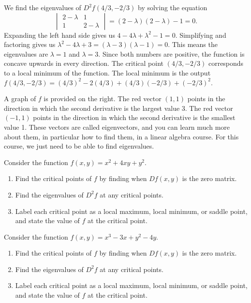 \begin{example}
{}
We find the eigenvalues of $D^2 f(4/3,-2/3)$ by solving the equation 
$$\begin{vmatrix}2-\lambda&1 \\1&2-\lambda\end{vmatrix} = (2-\lambda)(2-\lambda)-1=0.$$ 
 Expanding the left hand side gives us {$4-4\lambda + \lambda^2 -1 = 0$}. Simplifying and factoring gives us $\lambda^2-4\lambda +3 = (\lambda-3)(\lambda -1) = 0$. This means the eigenvalues are $\lambda = 1$ and $\lambda=3$. Since both numbers are positive, the function is concave upwards in every direction.  The critical point $(4/3,-2/3)$ corresponds to a local minimum of the function. The local minimum is the output $f(4/3,-2/3) = (4/3)^2-2(4/3)+(4/3)(-2/3)+(-2/3)^2$.

A graph of $f$ is provided on the right. 
The red vector $(1,1)$ points in the direction in which the second derivative is the largest value 3. 
The red vector $(-1,1)$ points in the direction in which the second derivative is the smallest value 1.
These vectors are called eigenvectors, and you can learn much more about them, in particular how to find them, in a linear algebra course. For this course, we just need to be able to find eigenvalues.
\end{example}
 
\begin{problem}
Consider the function $f(x,y)=x^2+4xy+y^2$.  
\begin{enumerate}
 \item Find the critical points of $f$ by finding when $Df(x,y)$ is the zero matrix.
 \item Find the eigenvalues of $D^2f$ at any critical points.
 \item Label each critical point as a local maximum, local minimum, or saddle point, and state the value of $f$ at the critical point.
\end{enumerate}
\end{problem}

\begin{problem}
Consider the function $f(x,y)=x^3-3x+y^2-4y$.  
\begin{enumerate}
 \item Find the critical points of $f$ by finding when $Df(x,y)$ is the zero matrix.
 \item Find the eigenvalues of $D^2f$ at any critical points.
 \item Label each critical point as a local maximum, local minimum, or saddle point, and state the value of $f$ at the critical point.
\end{enumerate}
\end{problem}

